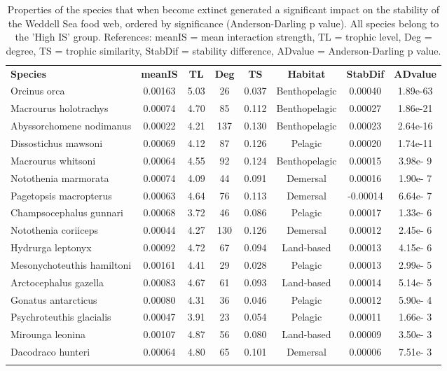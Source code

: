 \documentclass[gc, manuscript]{copernicus}
\begin{document}
\clearpage

\begin{table}[t]
\caption{Properties of the species that when become extinct generated a significant impact on the stability of the Weddell Sea food web, ordered by significance (Anderson-Darling p value). All species belong to the 'High IS' group.  References: meanIS = mean interaction strength, TL = trophic level, Deg = degree, TS = trophic similarity, StabDif = stability difference, ADvalue = Anderson-Darling p value.}
\begin{tabular}{l c c c c c c c}
\tophline

\textbf{Species} & \textbf{meanIS} & \textbf{TL} & \textbf{Deg} & \textbf{TS} & \textbf{Habitat} & \textbf{StabDif} & \textbf{ADvalue}\\
\middlehline
Orcinus orca & 0.00163 & 5.03 & 26 & 0.037 & Benthopelagic & 0.00040 & 1.89e-63 \\
\middlehline
Macrourus holotrachys & 0.00074 & 4.70 & 85 & 0.112 & Benthopelagic & 0.00027 & 1.86e-21 \\
\middlehline
Abyssorchomene nodimanus & 0.00022 & 4.21 & 137 & 0.130 & Benthopelagic & 0.00023 & 2.64e-16 \\
\middlehline
Dissostichus mawsoni & 0.00069 & 4.12 & 87 & 0.126 & Pelagic & 0.00020 & 1.74e-11 \\
\middlehline
Macrourus whitsoni & 0.00064 & 4.55 & 92 & 0.124 & Benthopelagic & 0.00015 & 3.98e- 9 \\
\middlehline
Notothenia marmorata & 0.00074 & 4.09 & 44 & 0.091 & Demersal & 0.00016 & 1.90e- 7 \\
\middlehline
Pagetopsis macropterus & 0.00063 & 4.64 & 76 & 0.113 & Demersal & -0.00014 & 6.64e- 7 \\
\middlehline
Champsocephalus gunnari & 0.00068 & 3.72 & 46 & 0.086 & Pelagic & 0.00017 & 1.33e- 6 \\
\middlehline
Notothenia coriiceps & 0.00044 & 4.27 & 130 & 0.126 & Demersal & 0.00012 & 2.45e- 6 \\
\middlehline
Hydrurga leptonyx & 0.00092 & 4.72 & 67 & 0.094 & Land-based & 0.00013 & 4.15e- 6 \\
\middlehline
Mesonychoteuthis hamiltoni & 0.00161 & 4.41 & 29 & 0.028 & Pelagic & 0.00013 & 2.99e- 5 \\
\middlehline
Arctocephalus gazella & 0.00083 & 4.67 & 61 & 0.093 & Land-based & 0.00014 & 5.14e- 5 \\
\middlehline
Gonatus antarcticus & 0.00080 & 4.31 & 36 & 0.046 & Pelagic & 0.00012 & 5.90e- 4 \\
\middlehline
Psychroteuthis glacialis & 0.00047 & 3.91 & 23 & 0.054 & Pelagic & 0.00011 & 1.66e- 3 \\
\middlehline
Mirounga leonina & 0.00107 & 4.87 & 56 & 0.080 & Land-based & 0.00009 & 3.50e- 3 \\
\middlehline
Dacodraco hunteri & 0.00064 & 4.80 & 65 & 0.101 & Demersal & 0.00006 & 7.51e- 3 \\

\bottomhline
\end{tabular}
\end{table}
\end{document}
